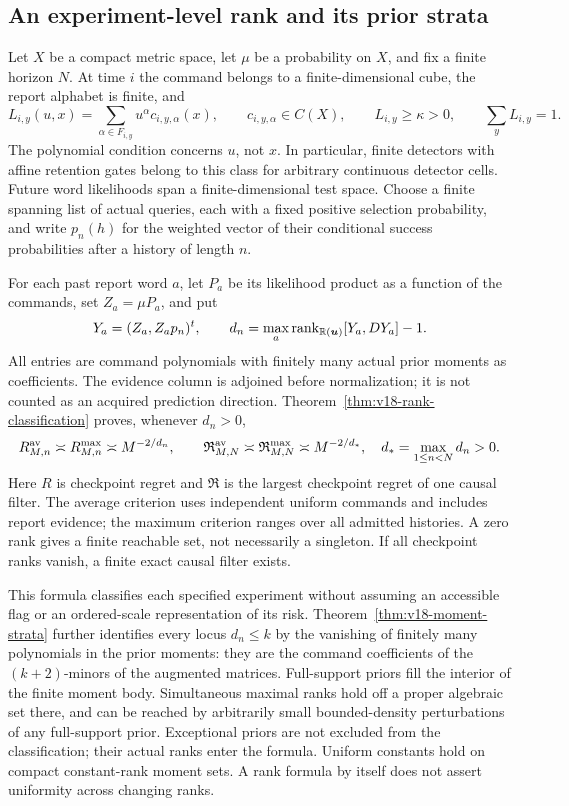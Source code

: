 \documentclass[11pt]{amsart}
\theoremstyle{definition}\newtheorem{definition}[theorem]{Definition}
\theoremstyle{remark}\newtheorem{remark}[theorem]{Remark}
\newcommand{\R}{\mathbb R}\newcommand{\N}{\mathbb N}\newcommand{\C}{\mathbb C}
\begin{document}
\subsection{An experiment-level rank and its prior strata}
Let $X$ be a compact metric space, let $\mu$ be a probability on $X$,
and fix a finite horizon $N$. At time $i$ the command belongs to a
finite-dimensional cube, the report alphabet is finite, and
\[
 L_{i,y}(u,x)=\sum_{\alpha\in F_{i,y}}u^\alpha c_{i,y,\alpha}(x),
 \qquad c_{i,y,\alpha}\in C(X),\qquad L_{i,y}\ge\kappa>0,
 \qquad\sum_yL_{i,y}=1.
\]
The polynomial condition concerns $u$, not $x$. In particular, finite
detectors with affine retention gates belong to this class for arbitrary
continuous detector cells. Future word likelihoods span a
finite-dimensional test space. Choose a finite spanning list of actual
queries, each with a fixed positive selection probability, and write
$p_n(h)$ for the weighted vector of their conditional success
probabilities after a history of length $n$.

For each past report word $a$, let $P_a$ be its likelihood product as a
function of the commands, set $Z_a=\mu P_a$, and put
\[
 Y_a=(Z_a,Z_ap_n)^t,\qquad
 d_n=\max_a\rank_{\R(\boldsymbol u)}[Y_a,DY_a]-1.
\]
All entries are command polynomials with finitely many actual prior
moments as coefficients. The evidence column is adjoined before
normalization; it is not counted as an acquired prediction direction.
Theorem~\ref{thm:v18-rank-classification} proves, whenever $d_n>0$,
\[
 R^{\rm av}_{M,n}\asymp R^{\rm max}_{M,n}\asymp M^{-2/d_n},
 \qquad
 \mathfrak R^{\rm av}_{M,N}\asymp
 \mathfrak R^{\rm max}_{M,N}\asymp M^{-2/d_*},
 \quad d_* =\max_{1\le n<N}d_n>0.
\]
Here $R$ is checkpoint regret and $\mathfrak R$ is the largest
checkpoint regret of one causal filter. The average criterion uses
independent uniform commands and includes report evidence; the maximum
criterion ranges over all admitted histories. A zero rank gives a
finite reachable set, not necessarily a singleton. If all checkpoint
ranks vanish, a finite exact causal filter exists.

This formula classifies each specified experiment without assuming an
accessible flag or an ordered-scale representation of its risk.
Theorem~\ref{thm:v18-moment-strata} further identifies every locus
$d_n\le k$ by the vanishing of finitely many polynomials in the prior
moments: they are the command coefficients of the $(k+2)$-minors of the
augmented matrices. Full-support priors fill the interior of the finite
moment body. Simultaneous maximal ranks hold off a proper algebraic
set there, and can be reached by arbitrarily small bounded-density
perturbations of any full-support prior. Exceptional priors are not
excluded from the classification; their actual ranks enter the formula.
Uniform constants hold on compact constant-rank moment sets. A rank
formula by itself does not assert uniformity across changing ranks.
\end{document}
